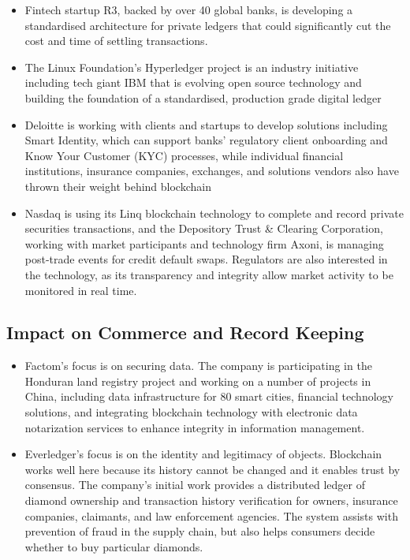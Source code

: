 \begin{itemize}
    \item Fintech startup R3, backed by over 40 global banks, is developing a standardised architecture for private ledgers that could significantly cut the cost and time of settling transactions.
    \item The Linux Foundation’s Hyperledger project is an industry initiative including tech giant IBM that is evolving open source technology and building the foundation of a standardised, production grade digital ledger
    \item Deloitte is working with clients and startups to develop solutions including Smart Identity, which can support banks’ regulatory client onboarding and Know Your Customer (KYC) processes, while individual financial institutions, insurance companies, exchanges, and solutions vendors also have thrown their weight behind blockchain
    \item Nasdaq is using its Linq blockchain technology to complete and record private securities transactions, and the Depository Trust \& Clearing Corporation, working with market participants and technology firm Axoni, is managing post-trade events for credit default swaps. Regulators are also interested in the technology, as its transparency and integrity allow market activity to be monitored in real time. 
\end{itemize}


\subsection{Impact on Commerce and Record Keeping}
\begin{itemize}
    \item Factom’s focus is on securing data. The company is participating in the Honduran land registry project and working on a number of projects in China, including data infrastructure for 80 smart cities, financial technology solutions, and integrating blockchain technology with electronic data notarization services to enhance integrity in information management. 
    \item Everledger’s focus is on the identity and legitimacy of objects. Blockchain works well here because its history cannot be changed and it enables trust by consensus. The company’s initial work provides a distributed ledger of diamond ownership and transaction history verification for owners, insurance companies, claimants, and law enforcement agencies. The system assists with prevention of fraud in the supply chain, but also helps consumers decide whether to buy particular diamonds.
\end{itemize}

